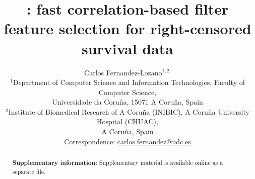 \documentclass[11pt,a4paper]{article}
\title{\pkg{survfcbf}: fast correlation-based filter feature selection for right-censored
survival data}
\author{Carlos Fernandez-Lozano$^{1,2}$\,\orcidlink{0000-0003-0413-5677}\\[4pt]
{\small $^1$Department of Computer Science and Information Technologies, Faculty of Computer
Science,}\\
{\small Universidade da Coru\~na, 15071 A Coru\~na, Spain}\\
{\small $^2$Institute of Biomedical Research of A Coru\~na (INIBIC), A Coru\~na University
Hospital (CHUAC),}\\
{\small A Coru\~na, Spain}\\[2pt]
{\small Correspondence: \href{mailto:carlos.fernandez@udc.es}{carlos.fernandez@udc.es}}}
\date{}
\begin{document}
\maketitle

\begin{abstract}
\noindent
\textbf{Supplementary information:} Supplementary material is available online as a
separate file.
\end{abstract}

\linenumbers





\end{document}
